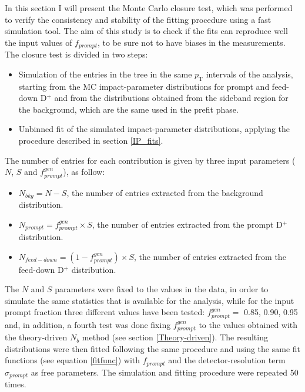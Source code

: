 \documentclass[b5paper,10pt,twoside,oldstyle,classica]{toptesi}
\newcommand{\pt}{p_\text{T}}
\begin{document}
In this section I will present the Monte Carlo closure test, which was performed to verify the consistency and stability of the fitting procedure using a fast simulation tool. The aim of this study is to check if the fits can reproduce well the input values of $f_{prompt}$, to be sure not to have biases in the measurements. The closure test is divided in two steps:
\begin{itemize}
 \item Simulation of the entries in the tree in the same $\pt$ intervals of the analysis, starting from the MC impact-parameter distributions for prompt and feed-down D$^+$ and from the distributions obtained from the sideband region for the background, which are the same used in the prefit phase.
 \item Unbinned fit of the simulated impact-parameter distributions, applying the procedure described in section \ref{IP_fits}. 
\end{itemize}
The number of entries for each contribution is given by three input parameters ($N$, $S$ and $f_{prompt}^{gen}$), as follow: 
\begin{itemize}
 \item $N_{bkg} = N-S$, the number of entries extracted from the background distribution.
 \item $N_{prompt} = f_{prompt}^{gen}\times S$, the number of entries extracted from the prompt D$^+$ distribution.
 \item $N_{feed-down} = (1-f_{prompt}^{gen})\times S$, the number of entries extracted from the feed-down D$^+$ distribution.
\end{itemize}
The $N$ and $S$ parameters were fixed to the values in the data, in order to simulate the same statistics that is available for the analysis, while for the input prompt fraction three different values have been tested: $f_{prompt}^{gen}=$ 0.85, 0.90, 0.95 and, in addition, a fourth test was done fixing $f_{prompt}^{gen}$ to the values obtained with the theory-driven $N_{b}$ method (see section \ref{Theory-driven}).   
The resulting distributions were then fitted following the same procedure and using the same fit functions (see equation \ref{fitfunc}) with $f_{prompt}$ and the detector-resolution term $\sigma_{prompt}$ as free parameters. The simulation and fitting procedure were repeated 50 times. 
\end{document}
